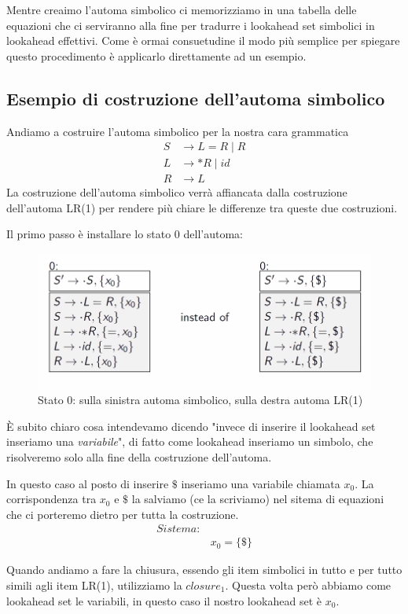 \documentclass[class=book, crop=false, oneside, 12pt]{standalone}
\begin{document}
Mentre creaimo l'automa simbolico ci memorizziamo in una tabella delle equazioni che ci serviranno alla fine per tradurre i lookahead set simbolici in lookahead effettivi. Come è ormai consuetudine il modo più semplice per spiegare questo procedimento è applicarlo direttamente ad un esempio.

\subsection*{Esempio di costruzione dell'automa simbolico}
Andiamo a costruire l'automa simbolico per la nostra cara grammatica
\begin{align*}
    S &\to L = R \mid R \\
    L &\to *R \mid id \\
    R &\to L
\end{align*}
La costruzione dell'automa simbolico verrà affiancata dalla costruzione dell'automa LR(1) per rendere più chiare le differenze tra queste due costruzioni.

Il primo passo è installare lo stato 0 dell'automa:
\begin{figure}
    \centering
    \includegraphics[width=.7\textwidth]{ex_automa_simbolico-stato_0.png}
    \caption{Stato 0: sulla sinistra automa simbolico, sulla destra automa LR(1)}
    \label{img:ex_automa_simbolico-stato_0}
\end{figure}
È subito chiaro cosa intendevamo dicendo "invece di inserire il lookahead set inseriamo una \emph{variabile}", di fatto come lookahead inseriamo un simbolo, che risolveremo solo alla fine della costruzione dell'automa.

In questo caso al posto di inserire \(\$\) inseriamo una variabile chiamata \(x_0\).
La corrispondenza tra \(x_0\) e \(\$\) la salviamo (ce la scriviamo) nel sitema di equazioni che ci porteremo dietro per tutta la costruzione.
\begin{align*}
    Sistema:& \\
            & x_0 = \{\$\}
\end{align*}

Quando andiamo a fare la chiusura, essendo gli item simbolici in tutto e per tutto simili agli item LR(1), utilizziamo la \(closure_1\).
Questa volta però abbiamo come lookahead set le variabili, in questo caso il nostro lookahead set è \(x_0\).
\end{document}

